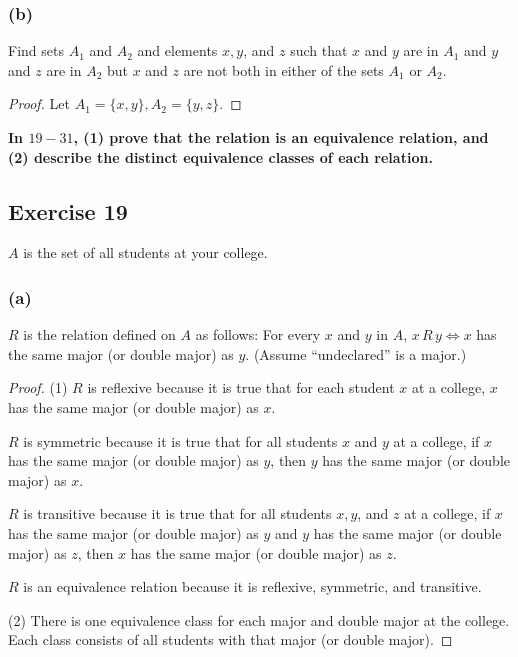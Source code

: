 \documentclass[14pt]{extarticle}
\newcommand{\cy}{\color{cyan}}
\begin{document}
\subsubsection{(b)}
Find sets \(A_1\) and \(A_2\) and elements \(x, y\), and \(z\) such that \(x\) and \(y\) are in \(A_1\) and \(y\) and
\(z\) are in \(A_2\) but \(x\) and \(z\) are not both in either of the sets \(A_1\) or \(A_2\).

\begin{proof}
        Let \(A_1 = \{x, y\}, A_2 = \{y, z\}\).
\end{proof}

{\bf \cy In $19-31$, (1) prove that the relation is an equivalence relation, and (2) describe the distinct
equivalence classes of each relation.}

\subsection{Exercise 19}
\(A\) is the set of all students at your college.

\subsubsection{(a)}
\(R\) is the relation defined on \(A\) as follows: For every \(x\) and \(y\) in \(A\), \(x \,R\, y \iff x\) has
the same major (or double major) as \(y\). (Assume “undeclared” is a major.)

\begin{proof}
        (1) \(R\) is reflexive because it is true that for each student \(x\) at a college, \(x\) has the same major (or
        double major) as \(x\).

        \(R\) is symmetric because it is true that for all students \(x\) and \(y\) at a college, if \(x\) has the same major
        (or double major) as \(y\), then \(y\) has the same major (or double major) as \(x\).

        \(R\) is transitive because it is true that for all students \(x, y\), and \(z\) at a college, if \(x\) has the
        same major (or double major) as \(y\) and \(y\) has the same major (or double major) as \(z\), then \(x\) has the
        same major (or double major) as \(z\).

        \(R\) is an equivalence relation because it is reflexive, symmetric, and transitive.

        (2) There is one equivalence class for each major and double major at the college. Each class consists of all
        students with that major (or double major).
\end{proof}
\end{document}
